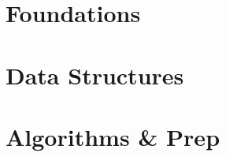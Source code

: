 \documentclass[11pt,fleqn]{book} %
\begin{document}
\usechapterimagefalse %

\pagestyle{empty} %

\tableofcontents %

\usechapterimagetrue %

\cleardoublepage %

\pagestyle{fancy} %


\part{Foundations}







\part{Data Structures}







\part{Algorithms \& Prep}





\end{document}
